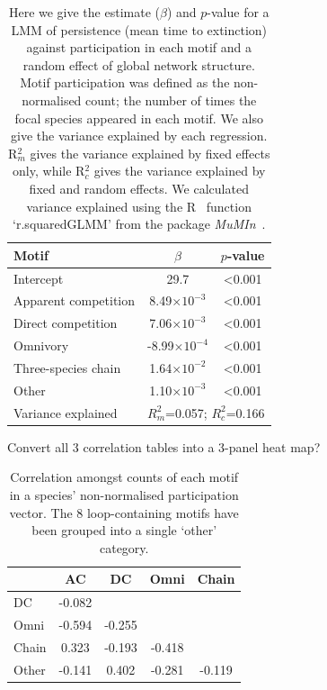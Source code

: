 \documentclass[12pt]{article}
\begin{document}
\begin{spacing}{2.0}
		\begin{table}[h!]
		\caption{Here we give the estimate ($\beta$) and $p$-value for a LMM of persistence (mean time to extinction) against participation in each motif and a random effect of global network structure. Motif participation was defined as the non-normalised count; the number of times the focal species appeared in each motif. We also give the variance explained by each regression. R$^{2}_{m}$ gives the variance explained by fixed effects only, while R$^{2}_{c}$ gives the variance explained by fixed and random effects. We calculated variance explained using the R~\citep{R} function `r.squaredGLMM' from the package \emph{MuMIn}~\citep{MuMIn}.}
		\label{tab:persistence_motifs}
		\begin{tabular}{l | c c}
		 Motif & $\beta$ & $p$-value \\  
		 \hline
		 Intercept & 29.7 & \textless0.001 \\
		 \hline
		 Apparent competition & 8.49$\times10^{-3}$ & \textless0.001 \\
		 Direct competition & 7.06$\times10^{-3}$ & \textless0.001 \\
		 Omnivory &  -8.99$\times10^{-4}$ & \textless0.001 \\
		 Three-species chain &  1.64$\times10^{-2}$ & \textless0.001 \\
		 Other &  1.10$\times10^{-3}$ & \textless0.001 \\
		 \hline
		 Variance explained & \multicolumn{2}{c}{$R^{2}_m$=0.057; $R^2_c$=0.166} \\

		 \hline
		 \end{tabular}
		 \end{table}


		 Convert all 3 correlation tables into a 3-panel heat map?


		\begin{table}[h!]
		\caption{Correlation amongst counts of each motif in a species' non-normalised participation vector. The 8 loop-containing motifs have been grouped into a single `other' category.}
		\label{tab:count_correlations}
		\begin{tabular}{l | c c c c}
			& AC & DC & Omni & Chain \\
		\hline
		DC    & -0.082 &        &        &        \\   
		Omni  & -0.594 & -0.255 &        &        \\
		Chain &  0.323 & -0.193 & -0.418 &        \\
		Other & -0.141 &  0.402 & -0.281 & -0.119 \\
		\hline
		\end{tabular}
		\end{table}


\end{spacing}
\end{document}
